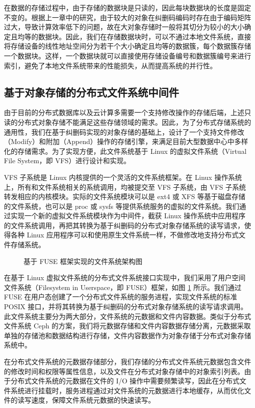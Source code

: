 在数据的存储过程中，由于存储的数据块是只读的，因此每块数据块的长度是固定不变的。根据上一章中的研究，由于较大的对象在纠删码编码时存在由于编码矩阵过大，导致计算效率低下的问题，故在大对象存储时一般将其切分为较小的大小确定且均等的数据块。因此，我们在存储数据块时，可以不通过本地文件系统，直接将存储设备的线性地址空间分为若干个大小确定且均等的数据簇，每个数据簇存储一个数据块。这样，一个数据块就可以直接使用存储设备编号和数据簇编号来进行索引，避免了本地文件系统带来的性能损失，从而提高系统的并行性。
\subsection{基于对象存储的分布式文件系统中间件}
由于目前的分布式数据库以及云计算多需要一个支持修改操作的存储后端，上述只读的分布式对象存储不能满足这些存储领域的需求。因此，为了分布式存储系统的通用性，我们在基于纠删码实现的对象存储的基础上，设计了一个支持文件修改（Modify）和附加（Append）操作的存储引擎，来满足目前大型数据中心中多样化的存储需求。为了实现方便，此文件系统基于 Linux 的虚拟文件系统（Virtual File System，即 VFS）进行设计和实现。

VFS 子系统是 Linux 内核提供的一个灵活的文件系统框架\cite{wetzel2017virtual}。在 Linux 操作系统上，所有和文件系统相关的系统调用，均被提交至 VFS 子系统，由 VFS 子系统转发相应的内核模块。实际的文件系统模块可以是 ext4 或 XFS 等基于磁盘存储的文件系统，也可以是 proc 或 sysfs 等提供系统服务的虚拟的文件系统。我们通过实现一个新的虚拟文件系统模块作为中间件，截获 Linux 操作系统中应用程序的文件系统调用，再把其转换为基于纠删码的分布式对象存储系统的读写请求，使得各种 Linux 应用程序可以和使用原生文件系统一样，不做修改地支持分布式文件存储系统。

\begin{figure}[!htb]
\centering
\resizebox{.8\textwidth}{!}{}
\caption{基于 FUSE 框架实现的文件系统架构图}
\label{p3}
\end{figure}

在基于 Linux 虚拟文件系统的分布式文件系统接口实现中，我们采用了用户空间文件系统（Filesystem in Userspace，即 FUSE）框架，如图 \ref{p3} 所示。我们通过 FUSE 在用户态创建了一个分布式文件系统的服务进程，实现文件系统的标准 POSIX 接口，并将其转换为基于纠删码的分布式对象存储系统的读写请求调用。此文件系统主要分为两大部分，文件系统的元数据和文件内容数据。类似于分布式文件系统 Ceph 的方案，我们将元数据存储和文件内容数据存储分离，元数据采取单独的存储池和数据结构进行存储，文件内容数据作为对象存储于分布式对象存储系统中。

在分布式文件系统的元数据存储部分，我们存储的分布式文件系统元数据包含文件的修改时间和权限等属性信息，以及文件在分布式对象存储中的对象索引列表。由于分布式文件系统的元数据在文件的 I/O 操作中需要频繁读写，因此在分布式文件系统进行挂载时，服务进程通过对文件系统的元数据进行本地缓存，从而优化文件的读写速度，保障文件系统元数据的快速读写。

